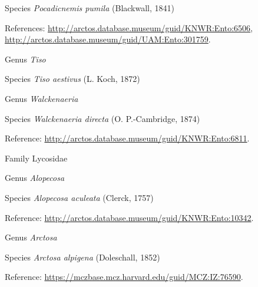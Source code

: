 \documentclass[9pt, article]{memoir}
\begin{document}
\begin{multicols}{2}
\vspace{6pt}\noindent\hspace{36pt}Species \textit{Pocadicnemis pumila} (Blackwall, 1841)


\vspace{6pt}References: 
\url{http://arctos.database.museum/guid/KNWR:Ento:6506}, 
\url{http://arctos.database.museum/guid/UAM:Ento:301759}.

\vspace{6pt}\noindent\hspace{30pt}Genus \textit{Tiso}


\vspace{6pt}\noindent\hspace{36pt}Species \textit{Tiso aestivus} (L. Koch, 1872)


\vspace{6pt}\noindent\hspace{30pt}Genus \textit{Walckenaeria}


\vspace{6pt}\noindent\hspace{36pt}Species \textit{Walckenaeria directa} (O. P.-Cambridge, 1874)


\vspace{6pt}Reference: 
\url{http://arctos.database.museum/guid/KNWR:Ento:6811}.

\vspace{6pt}\noindent\hspace{24pt}Family Lycosidae


\vspace{6pt}\noindent\hspace{30pt}Genus \textit{Alopecosa}


\vspace{6pt}\noindent\hspace{36pt}Species \textit{Alopecosa aculeata} (Clerck, 1757)


\vspace{6pt}Reference: 
\url{http://arctos.database.museum/guid/KNWR:Ento:10342}.

\vspace{6pt}\noindent\hspace{30pt}Genus \textit{Arctosa}


\vspace{6pt}\noindent\hspace{36pt}Species \textit{Arctosa alpigena} (Doleschall, 1852)


\vspace{6pt}Reference: 
\url{https://mczbase.mcz.harvard.edu/guid/MCZ:IZ:76590}.


\end{multicols}
\end{document}
